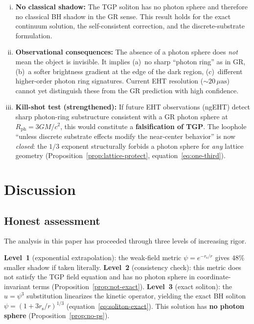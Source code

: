\documentclass[11pt,a4paper]{article}
\theoremstyle{definition}
\theoremstyle{remark}
\newcommand{\rs}{r_{\mathrm{s}}}
\begin{document}
\begin{enumerate}[(i)]
\item \textbf{No classical shadow:}\quad
  The TGP soliton has no photon sphere and therefore no classical BH
  shadow in the GR sense.  This result holds for the exact continuum
  solution, the self-consistent correction, and the discrete-substrate
  formulation.

\item \textbf{Observational consequences:}\quad
  The absence of a photon sphere does \emph{not} mean the object is
  invisible.  It implies (a)~no sharp ``photon ring'' as in GR,
  (b)~a softer brightness gradient at the edge of the dark region,
  (c)~different higher-order photon ring signatures.  Current EHT
  resolution ($\sim 20\,\mu\mathrm{as}$) cannot yet distinguish these
  from the GR prediction with high confidence.

\item \textbf{Kill-shot test (strengthened):}\quad
  If future EHT observations (ngEHT) detect sharp photon-ring
  substructure consistent with a GR photon sphere at
  $R_{\mathrm{ph}} = 3GM/c^2$, this would constitute a
  \textbf{falsification of TGP}.  The loophole ``unless discrete
  substrate effects modify the near-center behavior'' is now
  \emph{closed}: the $1/3$ exponent structurally forbids a photon
  sphere for \emph{any} lattice geometry
  (Proposition~\ref{prop:lattice-protect},
  equation~\eqref{eq:one-third}).
\end{enumerate}

\section{Discussion}\label{sec:discussion}

\subsection{Honest assessment}

The analysis in this paper has proceeded through three levels of
increasing rigor.

\textbf{Level~1} (exponential extrapolation): the weak-field metric
$\psi = e^{-\rs/r}$ gives $48\%$ smaller shadow if taken literally.
\textbf{Level~2} (consistency check): this metric does not satisfy the
TGP field equation and has no photon sphere in coordinate-invariant
terms (Proposition~\ref{prop:not-exact}).
\textbf{Level~3} (exact soliton): the $u = \psi^3$ substitution
linearizes the kinetic operator, yielding the exact BH soliton
$\psi = (1 + 3\rs/r)^{1/3}$ (equation~\eqref{eq:soliton-exact}).
This solution has \textbf{no photon sphere}
(Proposition~\ref{prop:no-ps}).
\end{document}
